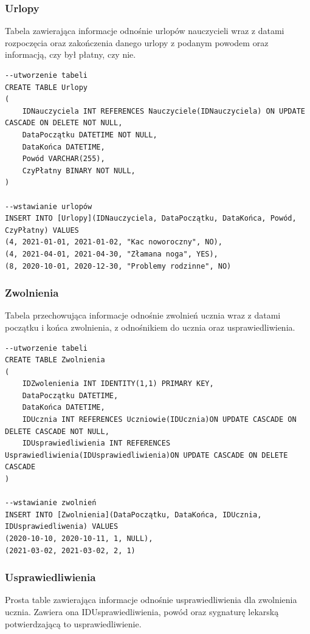\documentclass[60pt]{article}
\begin{document}
 \subsubsection{Urlopy}
Tabela zawierająca informacje odnośnie urlopów nauczycieli wraz z datami rozpoczęcia oraz zakończenia danego urlopy z podanym powodem oraz informacją, czy był płatny, czy nie.

\begin{verbatim}
--utworzenie tabeli
CREATE TABLE Urlopy
(
	IDNauczyciela INT REFERENCES Nauczyciele(IDNauczyciela) ON UPDATE CASCADE ON DELETE NOT NULL,
	DataPoczątku DATETIME NOT NULL,
	DataKońca DATETIME,
	Powód VARCHAR(255),
	CzyPłatny BINARY NOT NULL,
)

--wstawianie urlopów
INSERT INTO [Urlopy](IDNauczyciela, DataPoczątku, DataKońca, Powód, CzyPłatny) VALUES
(4, 2021-01-01, 2021-01-02, "Kac noworoczny", NO),
(4, 2021-04-01, 2021-04-30, "Złamana noga", YES),
(8, 2020-10-01, 2020-12-30, "Problemy rodzinne", NO)
\end{verbatim}

 \subsubsection{Zwolnienia}
Tabela przechowująca informacje odnośnie zwolnień ucznia wraz z datami początku i końca zwolnienia, z odnośnikiem do ucznia oraz usprawiedliwienia.

\begin{verbatim}
--utworzenie tabeli
CREATE TABLE Zwolnienia
(
	IDZwolenienia INT IDENTITY(1,1) PRIMARY KEY,
	DataPoczątku DATETIME,
	DataKońca DATETIME,
	IDUcznia INT REFERENCES Uczniowie(IDUcznia)ON UPDATE CASCADE ON DELETE CASCADE NOT NULL,
	IDUsprawiedliwienia INT REFERENCES Usprawiedliwienia(IDUsprawiedliwienia)ON UPDATE CASCADE ON DELETE CASCADE
)

--wstawianie zwolnień
INSERT INTO [Zwolnienia](DataPoczątku, DataKońca, IDUcznia, IDUsprawiedliwenia) VALUES
(2020-10-10, 2020-10-11, 1, NULL),
(2021-03-02, 2021-03-02, 2, 1)
\end{verbatim}

 \subsubsection{Usprawiedliwienia}
Prosta table zawierająca informacje odnośnie usprawiedliwienia dla zwolnienia ucznia. Zawiera ona IDUsprawiedliwienia, powód oraz sygnaturę lekarską potwierdzającą to usprawiedliwienie.
\end{document}
